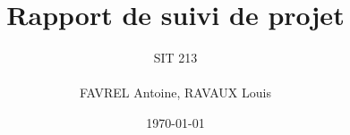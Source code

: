 \documentclass[11pt]{article}
\title{Rapport de suivi de projet}
\author{SIT 213 \\\\ FAVREL Antoine, RAVAUX Louis}
\date{\today}
\begin{document}
\maketitle	
\pagebreak

\tableofcontents
\pagebreak




\pagebreak




\end{document}
